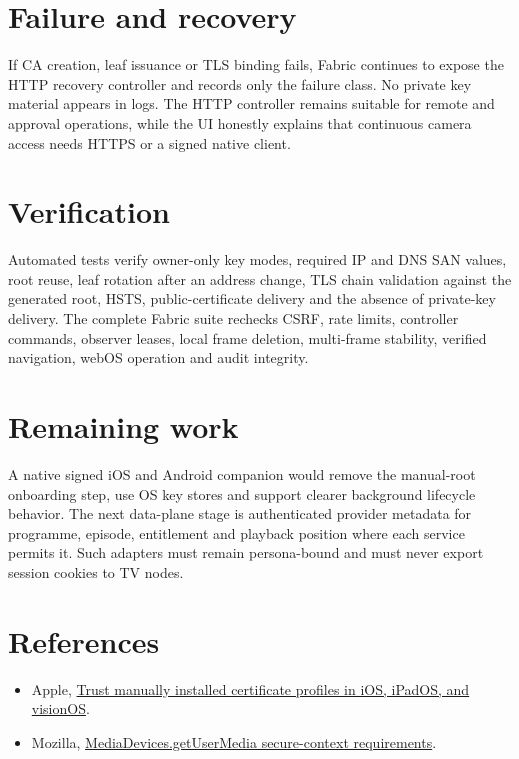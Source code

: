 \documentclass[11pt,a4paper]{article}
\begin{document}
\section{Failure and recovery}

If CA creation, leaf issuance or TLS binding fails, Fabric continues to expose
the HTTP recovery controller and records only the failure class.  No private key
material appears in logs.  The HTTP controller remains suitable for remote and
approval operations, while the UI honestly explains that continuous camera
access needs HTTPS or a signed native client.

\section{Verification}

Automated tests verify owner-only key modes, required IP and DNS SAN values, root
reuse, leaf rotation after an address change, TLS chain validation against the
generated root, HSTS, public-certificate delivery and the absence of private-key
delivery.  The complete Fabric suite rechecks CSRF, rate limits, controller
commands, observer leases, local frame deletion, multi-frame stability, verified
navigation, webOS operation and audit integrity.

\section{Remaining work}

A native signed iOS and Android companion would remove the manual-root onboarding
step, use OS key stores and support clearer background lifecycle behavior.  The
next data-plane stage is authenticated provider metadata for programme, episode,
entitlement and playback position where each service permits it.  Such adapters
must remain persona-bound and must never export session cookies to TV nodes.

\section{References}

\begin{itemize}
  \item Apple, \href{https://support.apple.com/en-us/102390}{Trust manually
  installed certificate profiles in iOS, iPadOS, and visionOS}.
  \item Mozilla, \href{https://developer.mozilla.org/en-US/docs/Web/API/MediaDevices/getUserMedia}{MediaDevices.getUserMedia secure-context requirements}.
\end{itemize}
\end{document}
